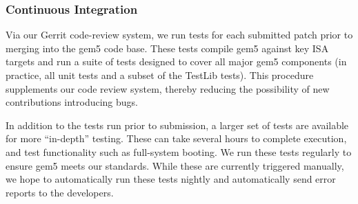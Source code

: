 \subsubsection{Continuous Integration}

Via our Gerrit code-review system, we run tests for each
submitted patch prior to merging into the gem5 code base. These tests
compile gem5 against key ISA targets and run a suite of tests designed to
cover all major gem5 components (in practice, all unit tests and a subset of
the TestLib tests). This procedure supplements our code review system, thereby
reducing the possibility of new contributions introducing bugs.

In addition to the tests run prior to submission, a larger set of tests are
available for more ``in-depth'' testing. These can take several hours to complete
execution, and test functionality such as
full-system booting. We run these tests regularly to ensure gem5 meets our
standards. While these are currently triggered manually, we hope to
automatically run these tests nightly and automatically send error reports to
the developers.
